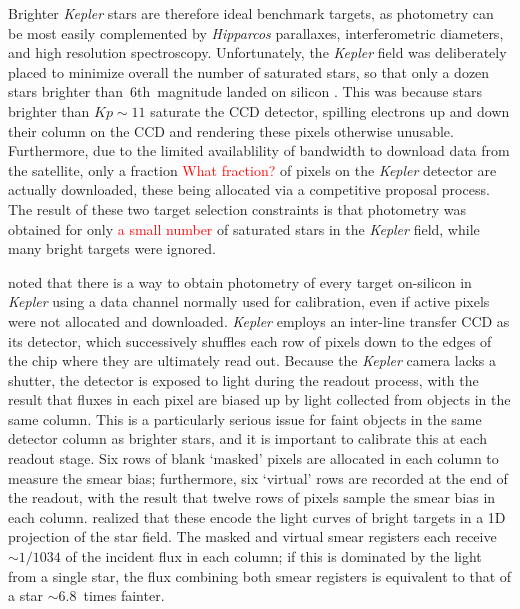 \documentclass[a4paper,fleqn,usenatbib]{mnras}
\newcommand{\kepler}{\emph{Kepler}\xspace}
\newcommand{\hipparcos}{\emph{Hipparcos}\xspace}
\begin{document}
Brighter \kepler stars are therefore ideal benchmark targets, as photometry can be most easily complemented by \hipparcos parallaxes, interferometric diameters, and high resolution spectroscopy.  
Unfortunately, the \kepler field was deliberately placed to minimize overall the number of saturated stars, so that only a dozen stars brighter than~6th~magnitude landed on silicon \citep{2010ApJ...713L..79K}. This was because stars brighter than $Kp \sim 11$ saturate the CCD detector, spilling electrons up and down their column on the CCD and rendering these pixels otherwise unusable. Furthermore, due to the limited availablility of bandwidth to download data from the satellite, only a fraction \textcolor{red}{What fraction?} of pixels on the \kepler detector are actually downloaded, these being allocated via a competitive proposal process. The result of these two target selection constraints is that photometry was obtained for only \textcolor{red}{a small number} of saturated stars in the \kepler field, while many bright targets were ignored. 

\citet{orig_smear} noted that there is a way to obtain photometry of every target on-silicon in \kepler using a data channel normally used for calibration, even if active pixels were not allocated and downloaded. \kepler employs an inter-line transfer CCD as its detector, which successively shuffles each row of pixels down to the edges of the chip where they are ultimately read out. Because the \kepler camera lacks a shutter, the detector is exposed to light during the readout process, with the result that fluxes in each pixel are biased up by light collected from objects in the same column. This is a particularly serious issue for faint objects in the same detector column as brighter stars, and it is important to calibrate this at each readout stage. Six rows of blank `masked' pixels are allocated in each column to measure the smear bias; furthermore, six `virtual' rows are recorded at the end of the readout, with the result that twelve rows of pixels sample the smear bias in each column. \citet{orig_smear} realized that these encode the light curves of bright targets in a 1D projection of the star field. The masked and virtual smear registers each receive $\sim 1/1034$ of the incident flux in each column; if this is dominated by the light from a single star, the flux combining both smear registers is equivalent to that of a star $\sim 6.8$~times fainter. 
\end{document}
